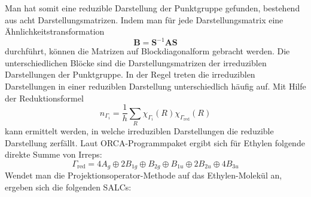 \documentclass[9pt]{report}
\begin{document}
\normalsize
Man hat somit eine reduzible Darstellung der Punktgruppe gefunden, bestehend aus acht Darstellungsmatrizen. Indem man für jede Darstellungsmatrix eine Ähnlichkeitstransformation
\begin{equation}
\boldsymbol{B} = \boldsymbol{S}^{-1}\boldsymbol{A}\boldsymbol{S}
\end{equation}
durchführt, können die Matrizen auf Blockdiagonalform gebracht werden. Die unterschiedlichen Blöcke sind die Darstellungsmatrizen der irreduziblen Darstellungen der Punktgruppe. In der Regel treten die irreduziblen Darstellungen in einer reduziblen Darstellung unterschiedlich häufig auf. Mit Hilfe der Reduktionsformel
\begin{equation}
n_{\Gamma_i}=\frac{1}{h}\sum_{R}\chi_{\Gamma_i}(R)\chi_{\Gamma_{\mathrm{red}}}(R)
\end{equation}
kann ermittelt werden, in welche irreduziblen Darstellungen die reduzible Darstellung zerfällt. Laut ORCA-Programmpaket ergibt sich für Ethylen folgende direkte Summe von Irreps:
\begin{equation}
\Gamma_{\mathrm{red}}= 4 A_{g} \oplus 2 B_{1g} \oplus B_{2g} \oplus B_{1u} \oplus 2 B_{2u} \oplus 4 B_{3u}
\end{equation}
Wendet man die Projektionsoperator-Methode auf das Ethylen-Molekül an, ergeben sich die folgenden SALCs:
\end{document}

